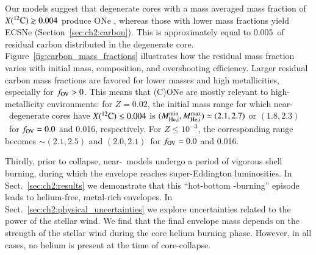 \documentclass[main.tex]{subfiles}
\begin{document}
Our models suggest that degenerate cores with a mass averaged mass fraction of $X(\iso{C}{12})\gtrsim 0.004$ produce ONe \ias, whereas those with lower  mass fractions yield ECSNe (Section~\ref{sec:ch2:carbon}). This is approximately equal to 0.005\msun\ of residual carbon distributed in the degenerate core. Figure~\ref{fig:carbon_mass_fractions} illustrates how the residual  mass fraction varies with initial mass, composition, and overshooting efficiency. Larger residual carbon mass fractions are favored for lower masses and high metallicities, especially for $f_{\rm OV}>0$. This means that (C)ONe \ias are mostly relevant to high-metallicity environments: for $Z=0.02$, the initial mass range for which near-\mch\ degenerate cores have $X(\iso{C}{12})\leq 0.004$ is $(M^{\rm min}_{\rm He, i},M^{\rm max}_{\rm He, i})  \simeq (2.1, 2.7)$ or $(1.8, 2.3)$\msun\ for $f_{\rm OV}=0.0$ and 0.016, respectively. For $Z\leq10^{-3}$, the corresponding range becomes $\sim(2.1, 2.5)$ and $(2.0, 2.1)$\msun\ for $f_{\rm OV}=0.0$ and 0.016.

Thirdly, prior to collapse, near-\mch\ models undergo a period of vigorous shell burning, during which the envelope reaches super-Eddington luminosities. In Sect.~\ref{sec:ch2:results} we demonstrate that this ``hot-bottom -burning'' episode leads to helium-free, metal-rich envelopes. In Sect.~\ref{sec:ch2:physical_uncertainties} we explore uncertainties related to the power of the stellar wind. We find that the final envelope mass depends on the strength of the stellar wind during the core helium burning phase. However, in all cases, no helium is present at the time of core-collapse.  
\end{document}
